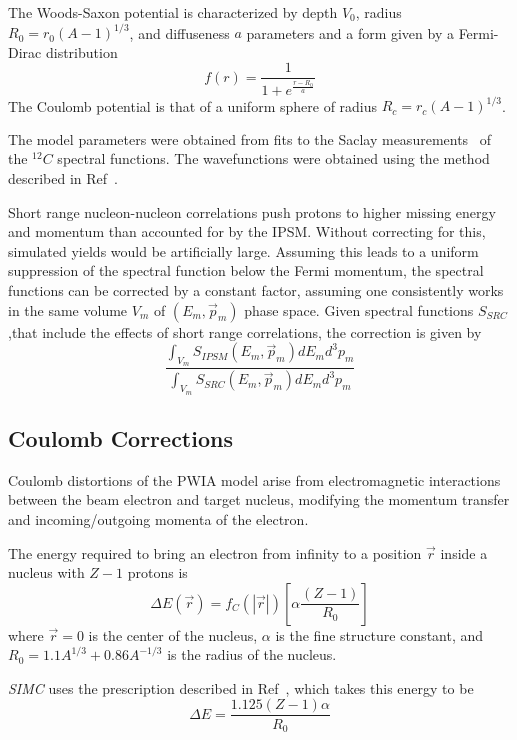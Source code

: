 The Woods-Saxon potential is characterized by
depth $V_0$,
radius $R_0=r_0(A-1)^{1/3}$, and
diffuseness $a$
parameters and a form given by a Fermi-Dirac distribution
\begin{equation}
    f(r) = \frac{1}{1+e^{\frac{r-R_0}{a}}}
\end{equation}
The Coulomb potential is that of a uniform sphere of radius
$R_c=r_c(A-1)^{1/3}$.


The model parameters were obtained from fits to the Saclay
measurements~\cite{Mougey_1976, Frullani_1984} of the ${}^{12}C$ spectral
functions.
The wavefunctions were obtained using the method described in
Ref~\cite{Giusti_1988, Giusti_1987, Blok_1991}.


Short range nucleon-nucleon correlations push protons to higher missing energy
and momentum than accounted for by the IPSM.
Without correcting for this, simulated yields would be artificially large.
Assuming this leads to a uniform suppression of the spectral function below the
Fermi momentum, the spectral functions can be corrected by a constant factor,
assuming one consistently works in the same volume $V_m$ of $(E_m,\vec{p}_m)$ phase
space.
Given spectral functions $S_{SRC}$,that include the effects of short range
correlations, the correction is given by
\begin{equation}
    \frac{\int_{V_m} S_{IPSM}(E_m,\vec{p}_m) dE_m d^3p_m}
         {\int_{V_m} S_{SRC} (E_m,\vec{p}_m) dE_m d^3p_m}
\end{equation}

\subsection{Coulomb Corrections}
Coulomb distortions of the PWIA model arise from electromagnetic interactions
between the beam electron and target nucleus, modifying the momentum transfer
and incoming/outgoing momenta of the electron.


The energy required to bring an electron from infinity to a position $\vec{r}$
inside a nucleus with $Z-1$ protons is
\begin{equation}
    \Delta E(\vec{r})=f_{C}(|\vec{r}|)\left[\alpha \frac{(Z-1)}{R_{0}}\right]
\end{equation}
where
$\vec{r}=0$ is the center of the nucleus,
$\alpha$ is the fine structure constant,
and
$R_0=1.1 A^{1/3}+0.86 A^{-1/3}$ is the radius of the nucleus.


\textit{SIMC} uses the prescription described in Ref~\cite{Aste_2005}, which
takes this energy to be
\begin{equation}
    \Delta E = \frac{1.125(Z-1)\alpha}{R_0}
\end{equation}

